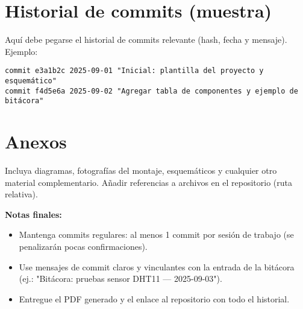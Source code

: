 \documentclass[12pt,a4paper]{article}
\begin{document}
\section{Historial de commits (muestra)}
Aquí debe pegarse el historial de commits relevante (hash, fecha y mensaje). Ejemplo:
\begin{verbatim}
commit e3a1b2c 2025-09-01 "Inicial: plantilla del proyecto y esquemático"
commit f4d5e6a 2025-09-02 "Agregar tabla de componentes y ejemplo de bitácora"
\end{verbatim}

\section{Anexos}
Incluya diagramas, fotografías del montaje, esquemáticos y cualquier otro material complementario. Añadir referencias a archivos en el repositorio (ruta relativa).

\bigskip
\noindent\textbf{Notas finales:}
\begin{itemize}
  \item Mantenga commits regulares: al menos 1 commit por sesión de trabajo (se penalizarán pocas confirmaciones).
  \item Use mensajes de commit claros y vinculantes con la entrada de la bitácora (ej.: "Bitácora: pruebas sensor DHT11 — 2025-09-03").
  \item Entregue el PDF generado y el enlace al repositorio con todo el historial.
\end{itemize}
\end{document}
